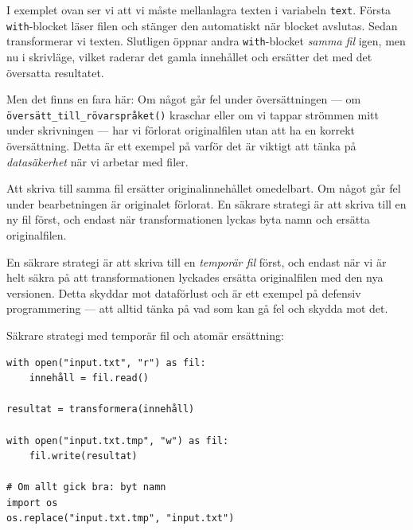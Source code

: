 
I exemplet ovan ser vi att vi måste mellanlagra texten i variabeln \texttt{text}. Första \texttt{with}-blocket läser filen och stänger den automatiskt när blocket avslutas. Sedan transformerar vi texten. Slutligen öppnar andra \texttt{with}-blocket \emph{samma fil} igen, men nu i skrivläge, vilket raderar det gamla innehållet och ersätter det med det översatta resultatet.

Men det finns en fara här: Om något går fel under översättningen --- om \texttt{översätt_till_rövarspråket()} kraschar eller om vi tappar strömmen mitt under skrivningen --- har vi förlorat originalfilen utan att ha en korrekt översättning. Detta är ett exempel på varför det är viktigt att tänka på \emph{datasäkerhet} när vi arbetar med filer.

\begin{frame}[fragile]
  \begin{remark}
    Att skriva till samma fil ersätter originalinnehållet omedelbart. Om något
    går fel under bearbetningen är originalet förlorat. En säkrare strategi är
    att skriva till en ny fil först, och endast när transformationen lyckas
    byta namn och ersätta originalfilen.
  \end{remark}
\end{frame}

En säkrare strategi är att skriva till en \emph{temporär fil} först, och endast när vi är helt säkra på att transformationen lyckades ersätta originalfilen med den nya versionen. Detta skyddar mot dataförlust och är ett exempel på defensiv programmering --- att alltid tänka på vad som kan gå fel och skydda mot det.

\begin{frame}[fragile]
  \begin{example}
    Säkrare strategi med temporär fil och atomär ersättning:
    \begin{verbatim}
with open("input.txt", "r") as fil:
    innehåll = fil.read()

resultat = transformera(innehåll)

with open("input.txt.tmp", "w") as fil:
    fil.write(resultat)

# Om allt gick bra: byt namn
import os
os.replace("input.txt.tmp", "input.txt")
    \end{verbatim}
  \end{example}
\end{frame}

